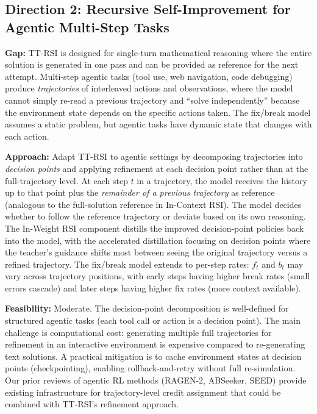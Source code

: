 \documentclass[11pt,a4paper]{article}
\begin{document}
\subsection{Direction 2: Recursive Self-Improvement for Agentic Multi-Step Tasks}
\textbf{Gap:} TT-RSI is designed for single-turn mathematical reasoning where the entire solution is generated in one pass and can be provided as reference for the next attempt. Multi-step agentic tasks (tool use, web navigation, code debugging) produce \emph{trajectories} of interleaved actions and observations, where the model cannot simply re-read a previous trajectory and ``solve independently'' because the environment state depends on the specific actions taken. The fix/break model assumes a static problem, but agentic tasks have dynamic state that changes with each action.

\textbf{Approach:} Adapt TT-RSI to agentic settings by decomposing trajectories into \emph{decision points} and applying refinement at each decision point rather than at the full-trajectory level. At each step $t$ in a trajectory, the model receives the history up to that point plus the \emph{remainder of a previous trajectory} as reference (analogous to the full-solution reference in In-Context RSI). The model decides whether to follow the reference trajectory or deviate based on its own reasoning. The In-Weight RSI component distills the improved decision-point policies back into the model, with the accelerated distillation focusing on decision points where the teacher's guidance shifts most between seeing the original trajectory versus a refined trajectory. The fix/break model extends to per-step rates: $f_t$ and $b_t$ may vary across trajectory positions, with early steps having higher break rates (small errors cascade) and later steps having higher fix rates (more context available).

\textbf{Feasibility:} Moderate. The decision-point decomposition is well-defined for structured agentic tasks (each tool call or action is a decision point). The main challenge is computational cost: generating multiple full trajectories for refinement in an interactive environment is expensive compared to re-generating text solutions. A practical mitigation is to cache environment states at decision points (checkpointing), enabling rollback-and-retry without full re-simulation. Our prior reviews of agentic RL methods (RAGEN-2, ABSeeker, SEED) provide existing infrastructure for trajectory-level credit assignment that could be combined with TT-RSI's refinement approach.
\end{document}
